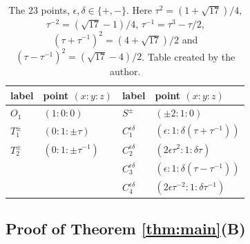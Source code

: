 \documentclass[11pt]{article}
\theoremstyle{plain}
\theoremstyle{definition}
\begin{document}
\begin{table}[t]
\centering
\small
\begin{tabular}{@{}llll@{}}
\toprule
label & point $(x:y:z)$ & label & point $(x:y:z)$\\
\midrule
$O_1$ & $(1:0:0)$ & $S^{\pm}$ & $(\pm2:1:0)$\\
$T_1^{\pm}$ & $(0:1:\pm\tau)$ & $C_1^{\epsilon\delta}$ & $(\epsilon:1:\delta(\tau+\tau^{-1}))$\\
$T_2^{\pm}$ & $(0:1:\pm\tau^{-1})$ & $C_2^{\epsilon\delta}$ & $(2\epsilon\tau^{2}:1:\delta\tau)$\\
 & & $C_3^{\epsilon\delta}$ & $(\epsilon:1:\delta(\tau-\tau^{-1}))$\\
 & & $C_4^{\epsilon\delta}$ & $(2\epsilon\tau^{-2}:1:\delta\tau^{-1})$\\
\bottomrule
\end{tabular}
\medskip
\caption{The $23$ points, $\epsilon,\delta\in\{+,-\}$.  Here $\tau^2=(1+\sqrt{17})/4$, $\tau^{-2}=(\sqrt{17}-1)/4$, $\tau^{-1}=\tau^3-\tau/2$, $(\tau+\tau^{-1})^2=(4+\sqrt{17})/2$ and $(\tau-\tau^{-1})^2=(\sqrt{17}-4)/2$. Table created by the author.}
\label{tab:points}
\end{table}

\subsection{Proof of Theorem \ref{thm:main}(B)}
\end{document}
